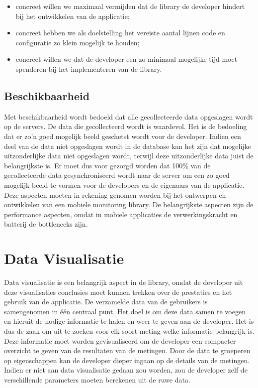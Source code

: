 \begin{itemize}
\item concreet willen we maximaal vermijden dat de library de developer hindert bij het ontwikkelen van de applicatie;

\item concreet hebben we als doelstelling het vereiste aantal lijnen code en configuratie zo klein mogelijk te houden;

\item concreet willen we dat de developer een zo minimaal mogelijke tijd moet spenderen bij het implementeren van de library.
\end{itemize}




\subsection{Beschikbaarheid}
Met beschikbaarheid wordt bedoeld dat alle gecollecteerde data opgeslagen wordt op de servers. De data die gecollecteerd wordt is waardevol. Het is de bedoeling dat er zo'n goed mogelijk beeld geschetst wordt voor de developer. Indien een deel van de data niet opgeslagen wordt in de database kan het zijn dat mogelijke uitzonderlijke data niet opgeslagen wordt, terwijl deze uitzonderlijke data juist de belangrijkste is. Er moet dus voor gezorgd worden dat 100\% van de gecollecteerde data gesynchroniseerd wordt naar de server om een zo goed mogelijk beeld te vormen voor de developers en de eigenaars van de applicatie.\\


Deze aspecten moeten in rekening genomen worden bij het ontwerpen en ontwikkelen van een mobiele monitoring library. De belangrijkste aspecten zijn de performance aspecten, omdat in mobiele applicaties de verwerkingskracht en batterij de bottlenecks zijn. 


\section{Data Visualisatie}
Data visualisatie is een belangrijk aspect in de library, omdat de developer uit deze visualisaties conclusies moet kunnen trekken over de prestaties en het gebruik van de applicatie. De verzamelde data van de gebruikers is samengenomen in \'e\'en centraal punt. Het doel is om deze data samen te voegen en hieruit de nodige informatie te halen en weer te geven aan de developer. Het is dus de zaak om uit te zoeken voor elk soort meting welke informatie belangrijk is. Deze informatie moet worden gevisualiseerd om de developer een compacter overzicht te geven van de resultaten van de metingen. Door de data te groeperen op eigenschappen kan de developer dieper ingaan op de details van de metingen. Indien er niet aan data visualisatie gedaan zou worden, zou de developer zelf de verschillende parameters moeten berekenen uit de ruwe data. \\

